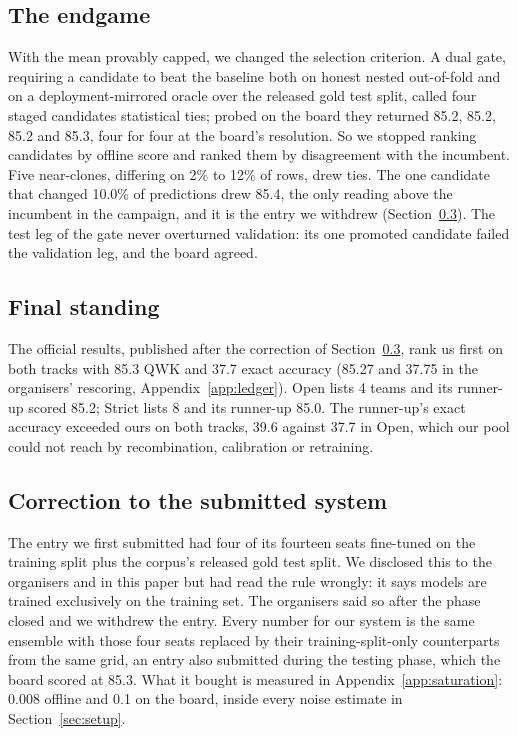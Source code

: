 \documentclass[11pt]{article}
\begin{document}
\subsection{The endgame}

With the mean provably capped, we changed the selection criterion. A dual gate, requiring a
candidate to beat the baseline both on honest nested out-of-fold and on a deployment-mirrored
oracle over the released gold test split, called four staged candidates statistical ties; probed
on the board they returned 85.2, 85.2, 85.2 and 85.3, four for four at the board's
resolution. So we stopped ranking candidates by offline score and ranked them by
disagreement with the incumbent. Five near-clones, differing on 2\% to 12\% of rows, drew ties.
The one candidate that changed 10.0\% of predictions drew 85.4, the only reading above the
incumbent in the campaign, and it is the entry we withdrew (Section~\ref{sec:correction}). The
test leg of the gate never overturned validation: its one promoted candidate failed the
validation leg, and the board agreed.

\subsection{Final standing}

The official results, published after the correction of Section~\ref{sec:correction}, rank
us first on both tracks with 85.3 QWK and 37.7 exact accuracy (85.27 and 37.75 in the
organisers' rescoring, Appendix~\ref{app:ledger}). Open lists 4 teams and its runner-up
scored 85.2; Strict lists 8 and its runner-up 85.0. The runner-up's exact accuracy exceeded
ours on both tracks, 39.6 against 37.7 in Open, which our pool could not reach by
recombination, calibration or retraining.

\subsection{Correction to the submitted system}
\label{sec:correction}

The entry we first submitted had four of its fourteen seats fine-tuned on the training split
plus the corpus's released gold test split. We disclosed this to the organisers and in this
paper but had read the rule wrongly: it says models are trained exclusively on the training
set. The organisers said so after the phase closed and we withdrew the entry. Every number
for our system is the same ensemble with those four seats
replaced by their training-split-only counterparts from the same grid, an entry also
submitted during the testing phase, which the board scored at 85.3. What it bought is
measured in Appendix~\ref{app:saturation}: 0.008 offline and 0.1 on the board, inside every
noise estimate in Section~\ref{sec:setup}.
\end{document}
